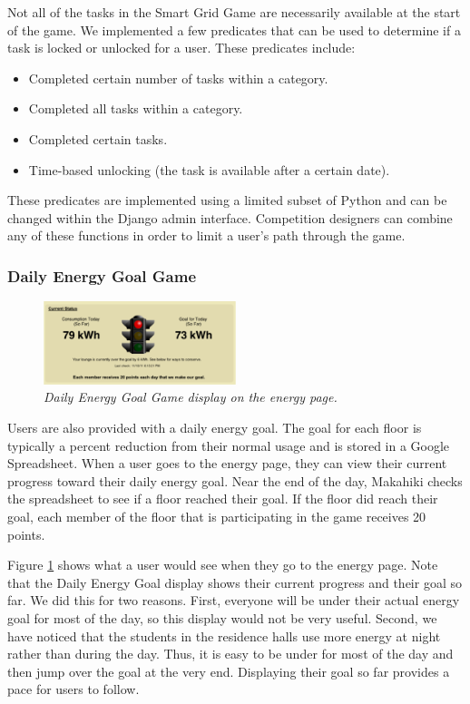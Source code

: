 \documentclass{acm_proc_article-sp}
\begin{document}
Not all of the tasks in the Smart Grid Game are necessarily available at the start of the game. We implemented a few predicates that can be used to determine if a task is locked or unlocked for a user. These predicates include:

\begin{itemize}
  \item Completed certain number of tasks within a category.
  \item Completed all tasks within a category.
  \item Completed certain tasks.
  \item Time-based unlocking (the task is available after a certain date).
\end{itemize}

These predicates are implemented using a limited subset of Python and can be changed within the Django admin interface. Competition designers can combine any of these functions in order to limit a user's path through the game.

\subsubsection{Daily Energy Goal Game}

\begin{figure}[t!]
  \center
  \includegraphics[width=0.5\textwidth]{daily-energy-goal-game.eps}
  \caption{\em \small Daily Energy Goal Game display on the energy page.}
  \label{fig:DailyEnergyGoal}
\end{figure}

Users are also provided with a daily energy goal. The goal for each floor is typically a percent reduction from their normal usage and is stored in a Google Spreadsheet. When a user goes to the energy page, they can view their current progress toward their daily energy goal. Near the end of the day, Makahiki checks the spreadsheet to see if a floor reached their goal. If the floor did reach their goal, each member of the floor that is participating in the game receives 20 points. 

Figure \ref{fig:DailyEnergyGoal} shows what a user would see when they go to the energy page. Note that the Daily Energy Goal display shows their current progress and their goal so far. We did this for two reasons. First, everyone will be under their actual energy goal for most of the day, so this display would not be very useful. Second, we have noticed that the students in the residence halls use more energy at night rather than during the day. Thus, it is easy to be under for most of the day and then jump over the goal at the very end. Displaying their goal so far provides a pace for users to follow. 
\end{document}
